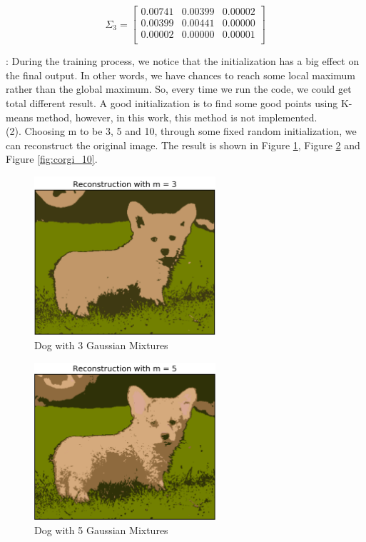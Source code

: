 $$\Sigma_3 =
\begin{bmatrix}
	0.00741	&	0.00399	&	0.00002 \\ 
	0.00399	&	0.00441	&	0.00000 \\
	0.00002	&	0.00000	&	0.00001	\\
\end{bmatrix}$$


: During the training process, we notice that the initialization has a big effect on the final output. In other words, we have chances to reach some local maximum rather than the global maximum. So, every time we run the code, we could get total different result. A good initialization is to find some good points using K-means method, however, in this work, this method is not implemented.\\

(2). Choosing m to be 3, 5 and 10, through some fixed random initialization, we can reconstruct the original image. The result is shown in Figure \ref{fig:corgi_3}, Figure \ref{fig:corgi_5} and Figure \ref{fig:corgi_10}.

\begin{figure}[H]
\centering
\includegraphics[width=0.6\textwidth]{./figures/corgi_3.png}
\caption{\label{fig:corgi_3} Dog with 3 Gaussian Mixtures}
\end{figure}

\begin{figure}[H]
\centering
\includegraphics[width=0.6\textwidth]{./figures/corgi_5.png}
\caption{\label{fig:corgi_5} Dog with 5 Gaussian Mixtures}
\end{figure}

